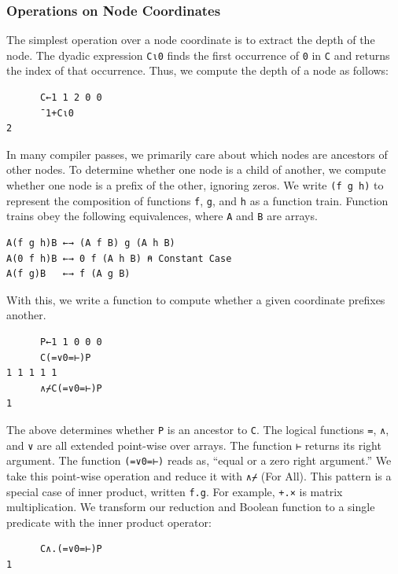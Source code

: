 ﻿\documentclass[numbers,10pt,preprint]{sigplanconf}
\begin{document}
\subsubsection{Operations on Node Coordinates}

The simplest operation over a node coordinate is to extract the depth of the node. The dyadic expression \verb;C⍳0; finds the first occurrence of \verb;0; in \verb;C; and returns the index of that occurrence. Thus, we compute the depth of a node as follows:

\begin{verbatim}
      C←1 1 2 0 0
      ¯1+C⍳0
2
\end{verbatim}

\noindent In many compiler passes, we primarily care about which nodes are ancestors of other nodes. To determine whether one node is a child of another, we compute whether one node is a prefix of the other, ignoring zeros. We write \verb;(f g h); to represent the composition of functions \verb;f;, \verb;g;, and \verb;h; as a function train. Function trains obey the following equivalences, where \verb;A; and \verb;B; are arrays.

\begin{verbatim}
A(f g h)B ←→ (A f B) g (A h B)
A(0 f h)B ←→ 0 f (A h B) ⍝ Constant Case
A(f g)B   ←→ f (A g B)
\end{verbatim}

\noindent With this, we write a function to compute whether a given coordinate prefixes another.

\begin{verbatim}
      P←1 1 0 0 0
      C(=∨0=⊢)P
1 1 1 1 1
      ∧⌿C(=∨0=⊢)P
1
\end{verbatim}

\noindent The above determines whether \verb;P; is an ancestor to \verb;C;. The logical functions \verb;=;, \verb;∧;, and \verb;∨; are all extended point-wise over arrays. The function \verb;⊢; returns its right argument. The function \verb;(=∨0=⊢); reads as, ``equal or a zero right argument.'' We take this point-wise operation and reduce it with \verb;∧⌿; (For All). This pattern is a special case of inner product, written \verb;f.g;. For example, \verb;+.×; is matrix multiplication. We transform our reduction and Boolean function to a single predicate with the inner product operator:

\begin{verbatim}
      C∧.(=∨0=⊢)P
1
\end{verbatim}
\end{document}
